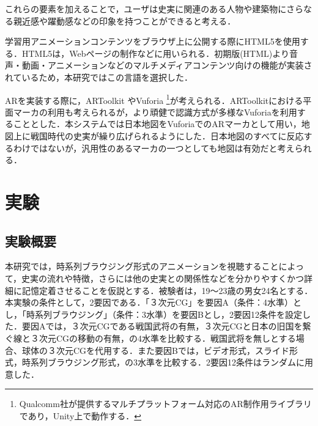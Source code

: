 \documentclass[a4paper,dvipdfmx]{hisken}
\begin{document}
これらの要素を加えることで，ユーザは史実に関連のある人物や建築物にさらなる親近感や躍動感などの印象を持つことができると考える．

学習用アニメーションコンテンツをブラウザ上に公開する際にHTML5を使用する．HTML5は，Webページの制作などに用いられる\cite{html}．初期版(HTML)より音声・動画・アニメーションなどのマルチメディアコンテンツ向けの機能が実装されているため，本研究ではこの言語を選択した．



ARを実装する際に，ARToolkit \cite{toolkit,satou}やVuforia \cite{vuforia} \footnote{Qualcomm社が提供するマルチプラットフォーム対応のAR制作用ライブラリであり，Unity上で動作する．}が考えられる．ARToolkitにおける平面マーカの利用も考えられるが，より頑健で認識方式が多様なVuforiaを利用することとした．本システムでは日本地図をVuforiaでのARマーカとして用い，地図上に戦国時代の史実が繰り広げられるようにした．日本地図のすべてに反応するわけではないが，汎用性のあるマーカの一つとしても地図は有効だと考えられる．


\section{実験}
\subsection{実験概要}
本研究では，時系列ブラウジング形式のアニメーションを視聴することによって，史実の流れや特徴，さらには他の史実との関係性などを分かりやすくかつ詳細に記憶定着させることを仮説とする．被験者は，19〜23歳の男女24名とする．本実験の条件として，2要因である．「３次元CG」を要因A（条件：4水準）とし，「時系列ブラウジング」（条件：3水準）を要因Bとし，2要因12条件を設定した．要因Aでは，３次元CGである戦国武将の有無，３次元CGと日本の旧国を繋ぐ線と３次元CGの移動の有無，の4水準を比較する．戦国武将を無しとする場合、球体の３次元CGを代用する．また要因Bでは，ビデオ形式，スライド形式，時系列ブラウジング形式，の3水準を比較する．2要因12条件はランダムに用意した．
\end{document}
